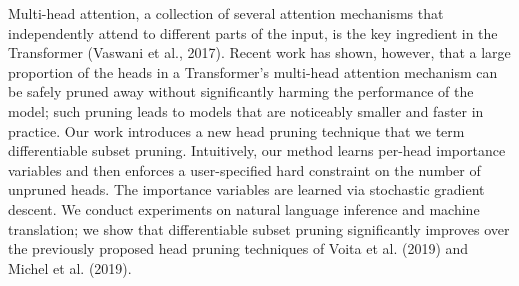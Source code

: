 Multi-head attention, a collection of several attention mechanisms that independently attend to different parts of the input, is the key ingredient in the Transformer (Vaswani et al., 2017). Recent work has shown, however, that a large proportion of the heads in a Transformer's multi-head attention mechanism can be safely pruned away without significantly harming the performance of the model; such pruning leads to models that are noticeably smaller and faster in practice. Our work introduces a new head pruning technique that we term differentiable subset pruning. Intuitively, our method learns per-head importance variables and then enforces a user-specified hard constraint on the number of unpruned heads. The importance variables are learned via stochastic gradient descent. We conduct experiments on natural language inference and machine translation; we show that differentiable subset pruning significantly improves over the previously proposed head pruning techniques of Voita et al. (2019) and Michel et al. (2019).